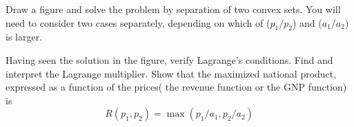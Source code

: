 Draw a figure and solve the problem by separation of two convex sets. You will need to consider two cases separately, depending on which of ($p_1 / p_2$) and ($a_1 / a_2$) is larger.

Having seen the solution in the figure, verify Lagrange's conditions. Find and interpret the Lagrange multiplier. Show that the maximized national product, expressed as a function of the prices( the revenue function or the GNP function) is 
\begin{equation*}
R(p_1, p_2) = \max (p_1 / a_1, p_2 / a_2)
\end{equation*}
 








